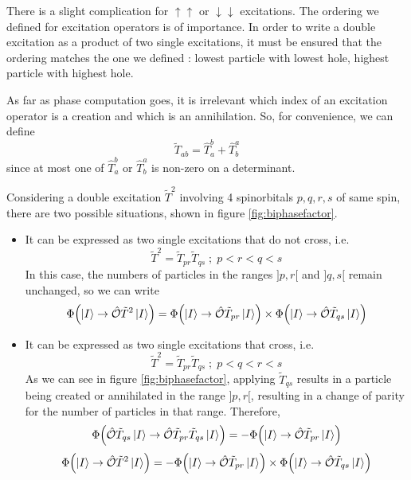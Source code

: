 \documentclass[./thesis.tex]{subfiles}
\begin{document}
There is a slight complication for $\uparrow \uparrow$ or $\downarrow \downarrow$ excitations. The ordering we defined for excitation operators is of importance. In order to write a double excitation as a product of two single excitations, it must be ensured that the ordering matches the one we defined : lowest particle with lowest hole, highest particle with highest hole.

As far as phase computation goes, it is irrelevant which index of an excitation operator is a creation and which is an annihilation. So, for convenience, we can define
\begin{equation}
\tilde T_{ab} = \hat T_a^b + \hat T_b^a
\end{equation}
since at most one of $\hat T_a^b$ or $\hat T_b^a$ is non-zero on a determinant.


Considering a double excitation $\tilde T^2$ involving 4 spinorbitals $p,q,r,s$ of same spin, there are two possible situations, shown in figure \ref{fig:biphasefactor}. 

\begin{itemize}
\item
It can be expressed as two single excitations that do not cross, i.e.
\begin{equation}
\tilde T^2=\tilde T_{pr} \tilde T_{qs} \; ; \; p<r<q<s
\end{equation}
In this case, the numbers of particles in the ranges $]p, r[$ and $]q, s[$ remain unchanged, so we can write
\begin{equation}
{\Phi \qty(\ket{I} \rightarrow {\hat{\mathcal{O}}}\tilde T^2 \ket{I})} =
{\Phi \qty(\ket{I} \rightarrow {\hat{\mathcal{O}}} \tilde T_{pr} \ket I)} \times
{\Phi \qty(\ket{I} \rightarrow {\hat{\mathcal{O}}}\tilde T_{qs} \ket I)}
\end{equation}

\item
It can be expressed as two single excitations that cross, i.e.
\begin{equation}
\tilde T^2=\tilde T_{pr} \tilde T_{qs} \; ; \; p<q<r<s
\end{equation}
As we can see in figure \ref{fig:biphasefactor}, applying  $\tilde T_{qs}$ results in a particle being created or annihilated in the range $]p,r[$, resulting in a change of parity for the number of particles in that range. Therefore,
\begin{equation}
{\Phi \qty({\hat{\mathcal{O}}}\tilde T_{qs} \ket{I} \rightarrow {\hat{\mathcal{O}}}\tilde T_{pr} \tilde T_{qs} \ket{I})} = -{\Phi \qty(\ket{I} \rightarrow {\hat{\mathcal{O}}} \tilde T_{pr} \ket{I})}
\end{equation}
\begin{equation}
{\Phi \qty(\ket{I} \rightarrow {\hat{\mathcal{O}}}\tilde T^2 \ket{I})} = -{\Phi \qty(\ket{I} \rightarrow {\hat{\mathcal{O}}} \tilde T_{pr} \ket{I})} \times {\Phi \qty(\ket{I} \rightarrow {\hat{\mathcal{O}}}\tilde T_{ qs} \ket{I})} 
\end{equation}

\end{itemize}
\end{document}
